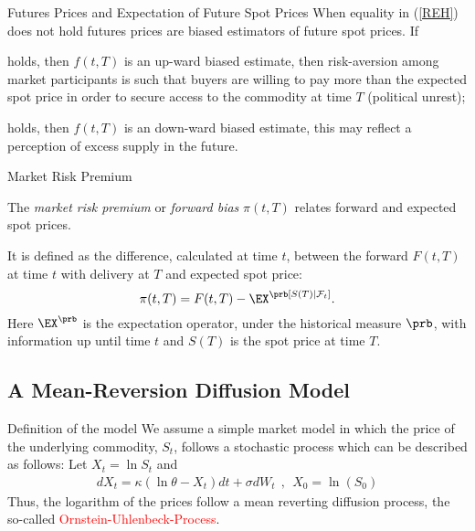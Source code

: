 {%
{Futures Prices and Expectation of Future Spot Prices}
When equality in (\ref{REH}) does not hold futures prices are biased estimators of
future spot prices. If






	holds, then $f(t,T)$ is an up-ward biased estimate, then risk-aversion
among market participants is such that buyers are willing to pay more than the expected
spot price in order to secure access to the commodity at time $T$ (political unrest);


	holds, then $f(t,T)$ is an down-ward biased estimate, this may reflect a
perception of excess supply in the future.





{Market Risk Premium}






	The \emph{market risk premium} or \emph{forward bias} $\pi (t,T)$
relates forward and expected spot prices.


	It is defined as the difference, calculated at time $t$, between
the forward $F(t,T)$ at time $t$ with delivery at $T$ and expected
spot price:
\begin{equation}\label{forward risk premium}
\pi(t,T)= F(t,T)-\EX^\prb[S(T)|\mathcal F_t].
\end{equation}
Here $\EX^\prb$ is the expectation operator, under the
historical measure $\prb$, with information up until time $t$ and
$S(T)$ is the spot price at time $T$.





\subsection[Mean-Reversion Model]{A Mean-Reversion Diffusion Model}

{Definition of the model}
We assume a simple market model in which the price of the underlying commodity, $S_t$, follows a stochastic process which can be described as follows:
Let $X_t = \ln S_t$ and
\begin{align*}
	dX_t = \kappa (\ln \theta - X_t)dt + \sigma dW_t~~,~~X_0 = \ln(S_0)
\end{align*}
Thus, the logarithm of the prices follow a mean reverting diffusion process, the so-called \textcolor{red}{Ornstein-Uhlenbeck-Process}.\\


}
